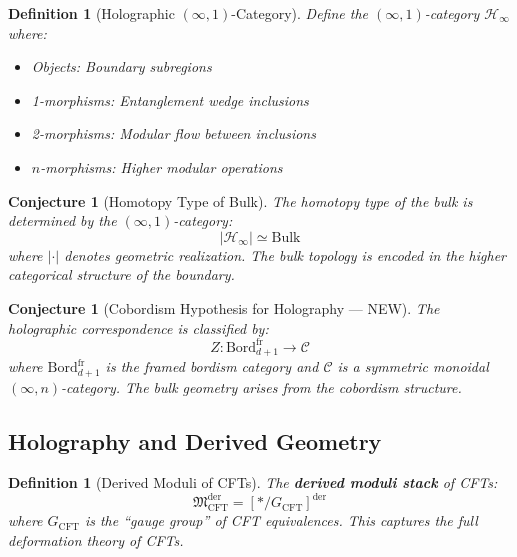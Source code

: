\documentclass[12pt,a4paper]{article}
\newtheorem{conjecture}[theorem]{Conjecture}
\newtheorem{definition}[theorem]{Definition}
\begin{document}
\begin{definition}[Holographic $(\infty, 1)$-Category]
Define the $(\infty, 1)$-category $\mathcal{H}_\infty$ where:
\begin{itemize}
    \item Objects: Boundary subregions
    \item 1-morphisms: Entanglement wedge inclusions
    \item 2-morphisms: Modular flow between inclusions
    \item $n$-morphisms: Higher modular operations
\end{itemize}
\end{definition}

\begin{conjecture}[Homotopy Type of Bulk]
The homotopy type of the bulk is determined by the $(\infty, 1)$-category:
\begin{equation}
|\mathcal{H}_\infty| \simeq \text{Bulk}
\end{equation}
where $|\cdot|$ denotes geometric realization. The bulk topology is encoded in the higher categorical structure of the boundary.
\end{conjecture}

\begin{conjecture}[Cobordism Hypothesis for Holography --- NEW]
The holographic correspondence is classified by:
\begin{equation}
Z: \text{Bord}_{d+1}^{\text{fr}} \to \mathcal{C}
\end{equation}
where $\text{Bord}_{d+1}^{\text{fr}}$ is the framed bordism category and $\mathcal{C}$ is a symmetric monoidal $(\infty, n)$-category. The bulk geometry arises from the cobordism structure.
\end{conjecture}

\subsection{Holography and Derived Geometry}

\begin{definition}[Derived Moduli of CFTs]
The \textbf{derived moduli stack} of CFTs:
\begin{equation}
\mathfrak{M}_{\text{CFT}}^{\text{der}} = [*/G_{\text{CFT}}]^{\text{der}}
\end{equation}
where $G_{\text{CFT}}$ is the ``gauge group'' of CFT equivalences. This captures the full deformation theory of CFTs.
\end{definition}
\end{document}
